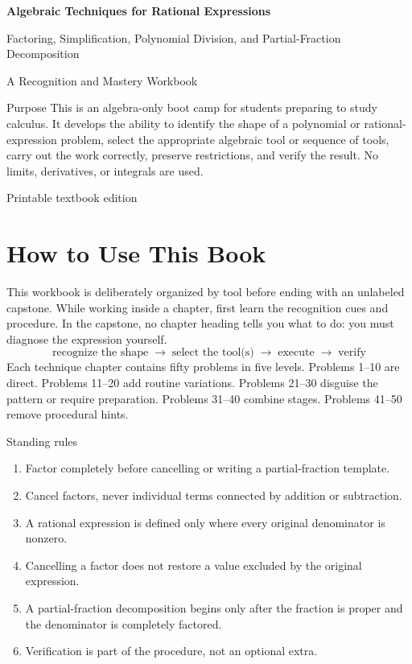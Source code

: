 \documentclass[11pt,oneside]{book}
\newcommand{\toolflow}{\[\boxed{\text{recognize the shape}\;\longrightarrow\;\text{select the tool(s)}\;\longrightarrow\;\text{execute}\;\longrightarrow\;\text{verify}}\]}
\begin{document}
\frontmatter
\hypersetup{pageanchor=false}
\begin{titlepage}
\centering
\vspace*{0.8in}
{\Huge\bfseries Algebraic Techniques for Rational Expressions\par}
\vspace{0.25in}
{\LARGE Factoring, Simplification, Polynomial Division, and Partial-Fraction Decomposition\par}
\vspace{0.45in}
{\Large A Recognition and Mastery Workbook\par}
\vfill
\begin{rulebox}{Purpose}
This is an algebra-only boot camp for students preparing to study calculus. It develops the ability to identify the shape of a polynomial or rational-expression problem, select the appropriate algebraic tool or sequence of tools, carry out the work correctly, preserve restrictions, and verify the result. No limits, derivatives, or integrals are used.
\end{rulebox}
\vfill
{\large Printable textbook edition\par}
\end{titlepage}
\hypersetup{pageanchor=true}
\cleardoublepage
\tableofcontents
\cleardoublepage
\chapter*{How to Use This Book}
This workbook is deliberately organized by tool before ending with an unlabeled capstone. While working inside a chapter, first learn the recognition cues and procedure. In the capstone, no chapter heading tells you what to do: you must diagnose the expression yourself.
\toolflow
Each technique chapter contains fifty problems in five levels. Problems 1--10 are direct. Problems 11--20 add routine variations. Problems 21--30 disguise the pattern or require preparation. Problems 31--40 combine stages. Problems 41--50 remove procedural hints.
\begin{rulebox}{Standing rules}
\begin{enumerate}[leftmargin=*]
\item Factor completely before cancelling or writing a partial-fraction template.
\item Cancel factors, never individual terms connected by addition or subtraction.
\item A rational expression is defined only where every original denominator is nonzero.
\item Cancelling a factor does not restore a value excluded by the original expression.
\item A partial-fraction decomposition begins only after the fraction is proper and the denominator is completely factored.
\item Verification is part of the procedure, not an optional extra.
\end{enumerate}
\end{rulebox}
\end{document}
